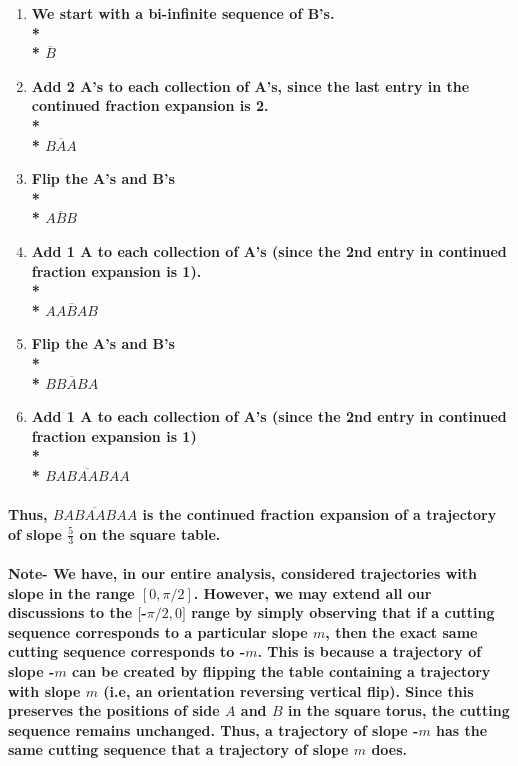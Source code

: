 \documentclass{report}
\begin{document}
\begin{enumerate}
\item \textbf{We start with a bi-infinite sequence of B’s.
\\* \\* $\overline{B}$}

\item \textbf{Add 2 A’s to each collection of A’s, since the last entry in the continued fraction expansion is 2.
\\* \\* $\overline{BAA}$}

\item \textbf{Flip the A’s and B’s
\\* \\* $\overline{ABB}$}

\item \textbf{Add 1 A to each collection of A’s (since the 2nd entry in continued fraction expansion is 1).
\\* \\* $\overline{AABAB}$}

\item \textbf{Flip the A’s and B’s
\\* \\* $\overline{BBABA}$}

\item \textbf{Add 1 A to each collection of A’s (since the 2nd entry in continued fraction expansion is 1)
\\* \\* $\overline{BABAABAA}$}
\end{enumerate}

\paragraph{Thus, $\overline{BABAABAA}$ is the continued fraction expansion of a trajectory of slope $\frac{5}{3}$ on the square table.}


\paragraph{Note- We have, in our entire analysis, considered trajectories with slope in the range $[0, \pi/2]$. However, we may extend all our discussions to the $[$-$\pi/2, 0]$ range by simply observing that if a cutting sequence corresponds to a particular slope $m$, then the exact same cutting sequence corresponds to -$m$. This is because a trajectory of slope -$m$ can be created by flipping the table containing a trajectory with slope $m$ (i.e, an orientation reversing vertical flip). Since this preserves the positions of side $A$ and $B$ in the square torus, the cutting sequence remains unchanged. Thus, a trajectory of slope -$m$ has the same cutting sequence that a trajectory of slope $m$ does.}
\end{document}
